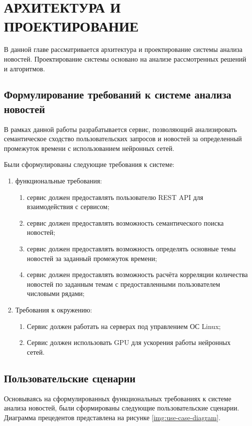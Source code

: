 \chapter{АРХИТЕКТУРА И ПРОЕКТИРОВАНИЕ}
\label{chap:arch_design}
\aftertitle

В данной главе рассматривается архитектура и проектирование системы анализа новостей. Проектирование системы основано на анализе рассмотренных решений и алгоритмов.

\section{Формулирование требований к системе анализа новостей}
В рамках данной работы разрабатывается сервис, позволяющий анализировать семантическое сходство пользовательских запросов и новостей за определенный промежуток времени с использованием нейронных сетей.

Были сформулированы следующие требования к системе:

\begin{enumerate}
    \item функциональные требования:
    \begin{enumerate}
        \item сервис должен предоставлять пользователю REST API для взаимодействия с сервисом;
        \item сервис должен предоставлять возможность семантического поиска новостей;
        \item сервис должен предоставлять возможность определять основные темы новостей за заданный промежуток времени;
        \item сервис должен предоставлять возможность расчёта корреляции количества новостей по заданным темам с предоставленными пользователем числовыми рядами;
    \end{enumerate}
    \item Требования к окружению:
    \begin{enumerate}
        \item Сервис должен работать на серверах под управлением ОС Linux;
        \item Сервис должен использовать GPU для ускорения работы нейронных сетей.
    \end{enumerate}
\end{enumerate}

\section{Пользовательские сценарии}
\label{chap:precedents}
Основываясь на сформулированных функциональных требованиях к системе анализа новостей, были сформированы следующие пользовательские сценарии. Диаграмма прецедентов представлена на рисунке \ref{img:use-case-diagram}.

